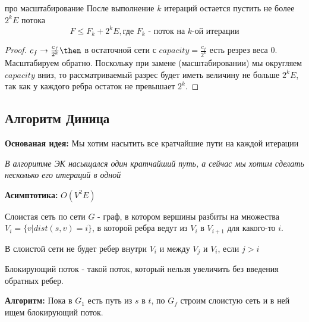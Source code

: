 
\begin{lemma}{про масштабирование}
  После выполнение $k$ итераций остается пустить не более $2^k E$ потока
  $$F \le F_k + 2^k E, \text{где $F_k$ - поток на $k$-ой итерации}$$
\end{lemma}

\begin{proof}
  $c_f \to \frac{c_f}{2^k} \then $ в остаточной сети с $capacity = \frac{c_f}{2^k}$ есть резрез веса 0. Масштабируем обратно. Поскольку при замене (масштабировании) мы округляем $capacity$ вниз, то рассматриваемый разрес будет иметь величину не больше $2^k E$, так как у каждого ребра остаток не превышает $2^k$.
\end{proof}

\subsection{Алгоритм Диница}
\textbf{Основаная идея:} Мы хотим насытить все кратчайшие пути на каждой итерации

\textit{В алгоритме ЭК насыщался один кратчайший путь, а сейчас мы хотим сделать несколько его итераций в одной}

\textbf{Асимптотика:} $O(V^2E)$

\begin{definition}
  Слоистая сеть по сети $G$ - граф, в котором вершины разбиты на множества $V_i = \{ v | dist(s,v) = i\}$, в которой ребра ведут из $V_i$ в $V_{i + 1}$ для какого-то $i$.
\end{definition}

\begin{note}
В слоистой сети не будет ребер внутри $V_i$ и между $V_j$ и $V_i$, если $j > i$
\end{note}

\begin{definition}
  Блокирующий поток - такой поток, который нельзя увеличить без введения обратных ребер.
\end{definition}

\textbf{Алгоритм:}
  Пока в $G_1$ есть путь из $s$ в $t$, по $G_f$ строим слоистую сеть и в ней ищем блокирующий поток.

